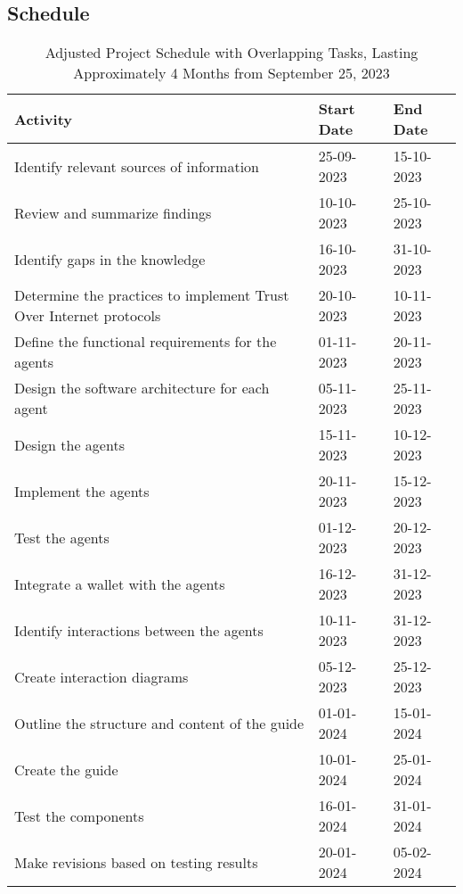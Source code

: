 \subsection{Schedule}

\begin{table}[h]
    \centering
        \begin{tabularx}{\textwidth}{|m{7.5cm}|X|X|}
            \hline
            Activity & Start Date & End Date \\
            \hline
            Identify relevant sources of information & 25-09-2023 & 15-10-2023 \\
            \hline
            Review and summarize findings & 10-10-2023 & 25-10-2023 \\
            \hline
            Identify gaps in the knowledge & 16-10-2023 & 31-10-2023 \\
            \hline
            Determine the practices to implement Trust Over Internet protocols & 20-10-2023 & 10-11-2023 \\
            \hline
            Define the functional requirements for the agents & 01-11-2023 & 20-11-2023 \\
            \hline
            Design the software architecture for each agent & 05-11-2023 & 25-11-2023 \\
            \hline
            Design the agents & 15-11-2023 & 10-12-2023 \\
            \hline
            Implement the agents & 20-11-2023 & 15-12-2023 \\
            \hline
            Test the agents & 01-12-2023 & 20-12-2023 \\
            \hline
            Integrate a wallet with the agents & 16-12-2023 & 31-12-2023 \\
            \hline
            Identify interactions between the agents & 10-11-2023 & 31-12-2023 \\
            \hline
            Create interaction diagrams & 05-12-2023 & 25-12-2023 \\
            \hline
            Outline the structure and content of the guide & 01-01-2024 & 15-01-2024 \\
            \hline
            Create the guide & 10-01-2024 & 25-01-2024 \\
            \hline
            Test the components & 16-01-2024 & 31-01-2024 \\
            \hline
            Make revisions based on testing results & 20-01-2024 & 05-02-2024 \\
            \hline
        \end{tabularx}
    \caption{Adjusted Project Schedule with Overlapping Tasks, Lasting Approximately 4 Months from September 25, 2023}
\end{table}
